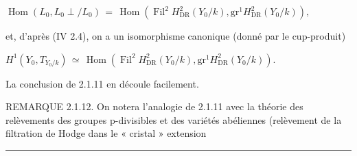 \documentclass[9pt]{article}
\newcommand{\CanonText}[1]{\par{\fontsize{8.0}{9.35}\selectfont\RaggedRight #1\par}\vspace{2.2pt}}
\newcommand{\CanonDisplay}[1]{\par\vspace{1.2pt}\begin{center}{\fontsize{7.2}{8.4}\selectfont\(\displaystyle #1\)}\end{center}\vspace{1.2pt}}
\begin{document}
\begin{minipage}[t][\dimexpr\textheight-5pt\relax][t]{\textwidth}
\CanonDisplay{\operatorname{Hom}(L_{0},L_{0}\perp{}/L_{0})\,=\,\operatorname{Hom}(\operatorname{Fil}^{2}H^{2}_{\mathrm{DR}}(Y_{0}/k),\text{gr}^{1}H^{2}_{\mathrm{DR}}(Y_{0}/k)),}
\CanonText{et, d'après (IV 2.4), on a un isomorphisme canonique (donné par le cup-produit)}
\CanonDisplay{H^{1}(Y_{0},T_{Y_{0}/k})\,\simeq{}\,\operatorname{Hom}(\operatorname{Fil}^{2}H^{2}_{\mathrm{DR}}(Y_{0}/k),\text{gr}^{1}H^{2}_{\mathrm{DR}}(Y_{0}/k)).}
\CanonText{La conclusion de 2.1.11 en découle facilement.}
\CanonText{REMARQUE 2.1.12. On notera l'analogie de 2.1.11 avec la théorie des relèvements des groupes p-divisibles et des variétés abéliennes (relèvement de la filtration de Hodge dans le « cristal » extension}
\vfill
{\color{Accent}\hrule height 0.35pt}\vspace{3pt}
\end{minipage}
\newpage
\end{document}
